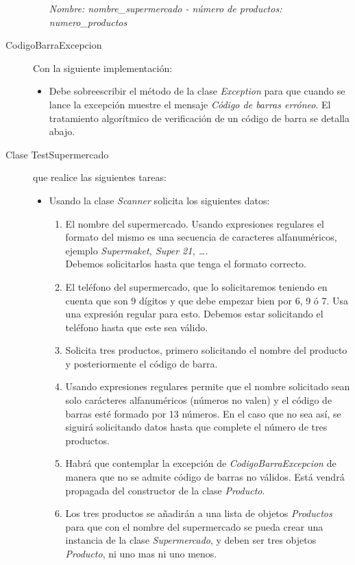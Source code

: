 \documentclass[addpoints,12pt]{exam}
\begin{document}
\begin{questions}
\begin{description}
\begin{itemize}
\emph{Nombre: nombre\_supermercado - número de productos: numero\_productos}
\end{itemize}
\item[CodigoBarraExcepcion] Con la siguiente implementación:
\begin{itemize}
\item Debe sobreescribir el método de la clase \emph{Exception} para que cuando se lance la excepción muestre el mensaje \emph{Código de barras erróneo}. El tratamiento algorítmico de verificación de un código de barra se detalla abajo.
\end{itemize}
\item[Clase TestSupermercado] que realice las siguientes tareas:
\begin{itemize}
\item Usando la clase \emph{Scanner} solicita los siguientes datos:
\begin{enumerate}
\item El nombre del supermercado. Usando expresiones regulares el formato del mismo es una secuencia de caracteres alfanuméricos, ejemplo \emph{Supermaket, Super 21, \dots.}\\ Debemos solicitarlos hasta que tenga el formato correcto.
\item El teléfono del supermercado, que lo solicitaremos teniendo en cuenta que son 9 dígitos y que debe empezar bien por 6, 9 ó 7. Usa una expresión regular para esto. Debemos estar solicitando el teléfono hasta que este sea válido.
\item Solicita tres productos, primero solicitando el nombre del producto y posteriormente el código de barra.
\item Usando expresiones regulares permite que el nombre solicitado sean solo carácteres alfanuméricos (números no valen) y el código de barras esté formado por 13 números. En el caso que no sea así, se siguirá solicitando datos hasta que complete el número de tres productos.
\item Habrá que contemplar la excepción de \emph{CodigoBarraExcepcion} de manera que no se admite código de barras no válidos. Está vendrá propagada del constructor de la clase \emph{Producto}.
\item Los tres productos se añadirán a una lista de objetos \emph{Productos} para que con el nombre del supermercado se pueda crear una instancia de la clase \emph{Supermercado}, y deben ser tres objetos \emph{Producto}, ni uno mas ni uno menos.

\end{enumerate}
\end{itemize}
\end{description}
\end{questions}
\end{document}
